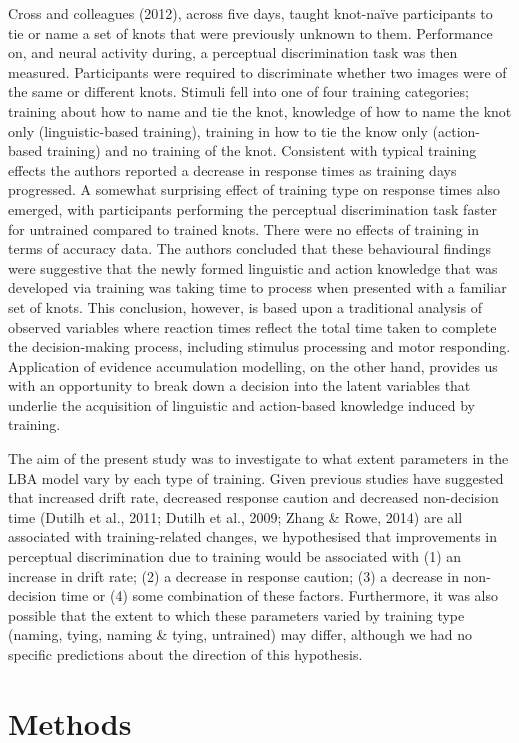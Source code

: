 \documentclass[
  man, donotrepeattitle,floatsintext]{apa6}
\begin{document}
Cross and colleagues (2012), across five days, taught knot-naïve participants to tie or name a set of knots that were previously unknown to them. Performance on, and neural activity during, a perceptual discrimination task was then measured. Participants were required to discriminate whether two images were of the same or different knots. Stimuli fell into one of four training categories; training about how to name and tie the knot, knowledge of how to name the knot only (linguistic-based training), training in how to tie the know only (action-based training) and no training of the knot. Consistent with typical training effects the authors reported a decrease in response times as training days progressed. A somewhat surprising effect of training type on response times also emerged, with participants performing the perceptual discrimination task faster for untrained compared to trained knots. There were no effects of training in terms of accuracy data. The authors concluded that these behavioural findings were suggestive that the newly formed linguistic and action knowledge that was developed via training was taking time to process when presented with a familiar set of knots. This conclusion, however, is based upon a traditional analysis of observed variables where reaction times reflect the total time taken to complete the decision-making process, including stimulus processing and motor responding. Application of evidence accumulation modelling, on the other hand, provides us with an opportunity to break down a decision into the latent variables that underlie the acquisition of linguistic and action-based knowledge induced by training.

The aim of the present study was to investigate to what extent parameters in the LBA model vary by each type of training. Given previous studies have suggested that increased drift rate, decreased response caution and decreased non-decision time (Dutilh et al., 2011; Dutilh et al., 2009; Zhang \& Rowe, 2014) are all associated with training-related changes, we hypothesised that improvements in perceptual discrimination due to training would be associated with (1) an increase in drift rate; (2) a decrease in response caution; (3) a decrease in non-decision time or (4) some combination of these factors. Furthermore, it was also possible that the extent to which these parameters varied by training type (naming, tying, naming \& tying, untrained) may differ, although we had no specific predictions about the direction of this hypothesis.

\section{Methods}\label{methods}
\end{document}
